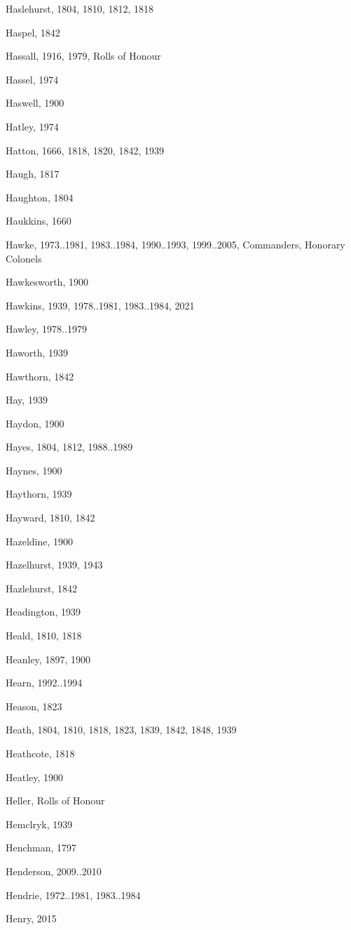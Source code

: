 {\begin{theindex}
\item Haslehurst, 1804, 1810, 1812, 1818
\item Haspel, 1842
\item Hassall, 1916, 1979, Rolls of Honour
\item Hassel, 1974
\item Haswell, 1900
\item Hatley, 1974
\item Hatton, 1666, 1818, 1820, 1842, 1939
\item Haugh, 1817
\item Haughton, 1804
\item Haukkins, 1660
\item Hawke, 1973..1981, 1983..1984, 1990..1993, 1999..2005, Commanders, Honorary Colonels
\item Hawkesworth, 1900
\item Hawkins, 1939, 1978..1981, 1983..1984, 2021
\item Hawley, 1978..1979
\item Haworth, 1939
\item Hawthorn, 1842
\item Hay, 1939
\item Haydon, 1900
\item Hayes, 1804, 1812, 1988..1989
\item Haynes, 1900
\item Haythorn, 1939
\item Hayward, 1810, 1842
\item Hazeldine, 1900
\item Hazelhurst, 1939, 1943
\item Hazlehurst, 1842
\item Headington, 1939
\item Heald, 1810, 1818
\item Heanley, 1897, 1900
\item Hearn, 1992..1994
\item Heason, 1823
\item Heath, 1804, 1810, 1818, 1823, 1839, 1842, 1848, 1939
\item Heathcote, 1818
\item Heatley, 1900
\item Heller, Rolls of Honour
\item Hemclryk, 1939
\item Henchman, 1797
\item Henderson, 2009..2010
\item Hendrie, 1972..1981, 1983..1984
\item Henry, 2015

\end{theindex}}
